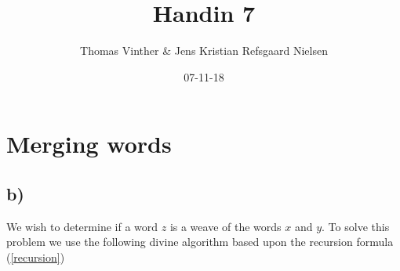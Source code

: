 \documentclass{article}
\theoremstyle{remark}
\numberwithin{equation}{section}
\begin{document}
	\author{Thomas Vinther \& Jens Kristian Refsgaard Nielsen}
	\title{Handin 7}
	\date{07-11-18}
	\maketitle
	\section{Merging words}
	
	\subsection{b)}
	We wish to determine if a word $z$ is a weave of the words $x$ and $y$. To solve this problem we use the following divine algorithm based upon the recursion formula (\ref{recursion})\\\\
\end{document}
